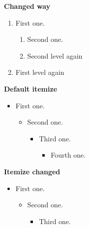\documentclass{article}
\begin{document}
	\textbf{Changed way}
	
	\renewcommand{\theenumi}{\Roman{enumi}}
	\renewcommand{\labelenumi}{[\textbf{\theenumi}]}
	\renewcommand{\theenumii}{\Alph{enumii}}
	\renewcommand{\labelenumii}{[\textbf{\theenumi}.\textit{\theenumii}]}
\begin{enumerate}
	\item First one.
	\begin{enumerate}
		\item Second one.
		\item Second level again
	\end{enumerate}
	\item First level again
\end{enumerate}

\textbf{Default itemize}

\begin{itemize}
	\item First one.
	\begin{itemize}
		\item Second one.
		\begin{itemize}
			\item Third one.
			\begin{itemize}
				\item Fourth one.
			\end{itemize}
		\end{itemize}
	\end{itemize}
\end{itemize}

\textbf{Itemize changed}
\renewcommand{\labelitemi}{$\circ$}
\renewcommand{\labelitemii}{$\clubsuit$}
\renewcommand{\labelitemiii}{$\diamondsuit$}
\begin{itemize}
	\item First one.
	\begin{itemize}
		\item Second one.
		\begin{itemize}
			\item Third one.	
		\end{itemize}
	\end{itemize}
\end{itemize}
\end{document}
